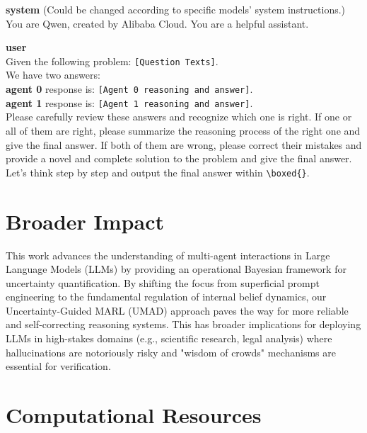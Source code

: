 \documentclass{article}
\theoremstyle{plain}
\theoremstyle{definition}
\theoremstyle{remark}
\begin{document}
\begin{userchat}
\textbf{system} (Could be changed according to specific models' system instructions.) \\
You are Qwen, created by Alibaba Cloud. You are a helpful assistant.

\textbf{user} \\
Given the following problem: \texttt{[Question Texts]}. \\
We have two answers: \\
\textbf{agent 0} response is: \texttt{[Agent 0 reasoning and answer]}. \\

\textbf{agent 1} response is: \texttt{[Agent 1 reasoning and answer]}. \\

Please carefully review these answers and recognize which one is right. If one or all of them are right, please summarize the reasoning process of the right one and give the final answer. If both of them are wrong, please correct their mistakes and provide a novel and complete solution to the problem and give the final answer. Let's think step by step and output the final answer within \texttt{\textbackslash boxed\{\}}.
\end{userchat}










\section{Broader Impact}

This work advances the understanding of multi-agent interactions in Large Language Models (LLMs) by providing an operational Bayesian framework for uncertainty quantification. By shifting the focus from superficial prompt engineering to the fundamental regulation of internal belief dynamics, our Uncertainty-Guided MARL (UMAD) approach paves the way for more reliable and self-correcting reasoning systems. This has broader implications for deploying LLMs in high-stakes domains (e.g., scientific research, legal analysis) where hallucinations are notoriously risky and "wisdom of crowds" mechanisms are essential for verification.


\section{Computational Resources}
\end{document}
